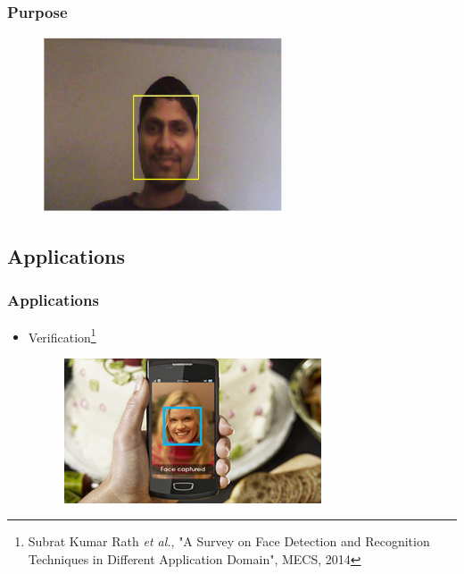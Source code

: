 \documentclass[10pt]{beamer}
\begin{document}
\begin{frame}
    \frametitle{Purpose} 
   \begin{figure}[!ht]
   \centering
   \includegraphics[width=2.8in]{face.jpg}
   \end{figure}
\end{frame}



\subsection{Applications}

\begin{frame}
    \frametitle{Applications}
   \begin{itemize}
   \item Verification\footnote{Subrat Kumar Rath \textit{et al.}, "A Survey on Face Detection and Recognition Techniques in Different Application Domain", MECS, 2014}
   \begin{figure}[!ht]
   \centering
   \includegraphics[width=3.0in]{verification.jpg}
   \end{figure}
   \end{itemize}
\end{frame}
\end{document}
